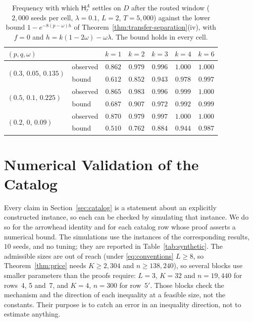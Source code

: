 \documentclass{article}
\theoremstyle{definition}
\theoremstyle{remark}
\theoremstyle{remark}
\newcommand{\Hyb}{\mathsf{H}}
\begin{document}
\begin{table}[h]
\centering
\caption{Frequency with which $\Hyb^A_\tau$ settles on $D$ after the routed
window ($2{,}000$ seeds per cell, $\lambda=0.1$, $L=2$, $T=5{,}000$) against the
lower bound $1-e^{-8(p-\omega)h}$ of Theorem~\ref{thm:transfer-separation}(iv),
with $f=0$ and $h=k(1-2\omega)-\omega\lambda$. The bound holds in every cell.}
\label{tab:transfer-check}
\small
\begin{tabular}{@{}llccccc@{}}
\toprule
$(p,q,\omega)$ & & $k=1$ & $k=2$ & $k=3$ & $k=4$ & $k=6$ \\
\midrule
\multirow{2}{*}{$(0.3,\,0.05,\,0.135)$} & observed & $0.862$ & $0.979$ & $0.996$ & $1.000$ & $1.000$ \\
 & bound & $0.612$ & $0.852$ & $0.943$ & $0.978$ & $0.997$ \\
\midrule
\multirow{2}{*}{$(0.5,\,0.1,\,0.225)$} & observed & $0.865$ & $0.983$ & $0.996$ & $0.999$ & $1.000$ \\
 & bound & $0.687$ & $0.907$ & $0.972$ & $0.992$ & $0.999$ \\
\midrule
\multirow{2}{*}{$(0.2,\,0,\,0.09)$} & observed & $0.870$ & $0.979$ & $0.997$ & $1.000$ & $1.000$ \\
 & bound & $0.510$ & $0.762$ & $0.884$ & $0.944$ & $0.987$ \\
\bottomrule
\end{tabular}
\end{table}

\section{Numerical Validation of the Catalog}
\label{app:synthetic}

Every claim in Section~\ref{sec:catalog} is a statement about an explicitly
constructed instance, so each can be checked by simulating that instance. We
do so for the arrowhead identity and for each catalog row whose proof asserts
a numerical bound. The simulations use the instances of the
corresponding results, $10$ seeds, and no tuning; they are reported in
Table~\ref{tab:synthetic}. The admissible sizes are out of reach (under
\eqref{eq:conventions} $L\ge8$, so Theorem~\ref{thm:price} needs $K\ge2{,}304$
and $n\ge138{,}240$), so several blocks use smaller parameters than the proofs
require: $L=3$, $K=32$ and $n=19{,}440$ for rows~4, 5 and~7, and $K=4$,
$n=300$ for row~$5'$. Those blocks check the mechanism and the direction of
each inequality at a feasible size, not the constants. Their purpose is to
catch an error in an inequality direction, not to estimate anything.
\end{document}
